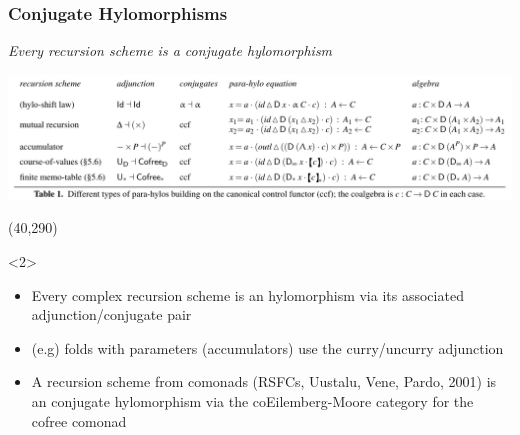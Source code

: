\begin{frame}[fragile]
  \frametitle{Conjugate Hylomorphisms}
  \centering
  {\Large\emph{Every recursion scheme is a conjugate hylomorphism}}%

  \vspace{.4cm}

  \begin{sticky}\includegraphics[width=\textwidth]{figures/types-of-parahylos-crop.pdf}\end{sticky}

  \Put(40,290){%
    \begin{onlyenv}<2>
    \begin{minipage}{.86\columnwidth}
    \begin{greenbox}
      \small
      \begin{itemize}
        \item Every complex recursion scheme is an hylomorphism via its associated adjunction/conjugate pair
        \item (e.g) folds with parameters (accumulators) use the curry/uncurry adjunction
        \item A recursion scheme from comonads (RSFCs, Uustalu, Vene, Pardo, 2001) is an conjugate hylomorphism via the coEilemberg-Moore category for the cofree comonad
      \end{itemize}
    \end{greenbox}
    \end{minipage}
    \end{onlyenv}
  }
\end{frame}

